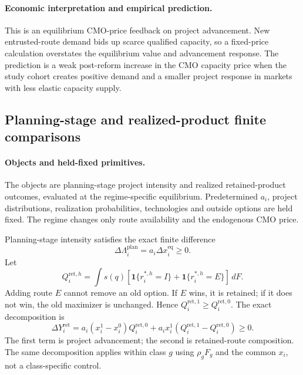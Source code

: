 \paragraph{Economic interpretation and empirical prediction.}
This is an equilibrium CMO-price feedback on project advancement. New
entrusted-route demand bids up scarce qualified capacity, so a fixed-price
calculation overstates the equilibrium value and advancement response. The
prediction is a weak post-reform increase in the CMO capacity price when the
study cohort creates positive demand and a smaller project response in markets
with less elastic capacity supply.

\subsection{Planning-stage and realized-product finite comparisons}
\label{subsec:p15-outcomes}

\paragraph{Objects and held-fixed primitives.}
The objects are planning-stage project intensity and realized retained-product
outcomes, evaluated at the regime-specific equilibrium. Predetermined
\(a_i\), project distributions, realization probabilities, technologies and
outside options are held fixed. The regime changes only route availability and
the endogenous CMO price.

Planning-stage intensity satisfies the exact finite difference
\begin{equation}
  \Delta\Lambda_i^{\mathrm{plan}}
  =
  a_i\Delta x_i^{\mathrm{eq}}\geq0.
  \label{eq:p15-planning-change}
\end{equation}
Let
\[
  Q_i^{\mathrm{ret},h}
  =
  \int s(q)
  [\mathbf 1\{r_i^{*,h}=I\}+\mathbf 1\{r_i^{*,h}=E\}]\,dF.
\]
Adding route \(E\) cannot remove an old option. If \(E\) wins, it is retained;
if it does not win, the old maximizer is unchanged. Hence
\(Q_i^{\mathrm{ret},1}\geq Q_i^{\mathrm{ret},0}\). The exact decomposition is
\begin{equation}
  \Delta Y_i^{\mathrm{ret}}
  =
  a_i(x_i^1-x_i^0)Q_i^{\mathrm{ret},0}
  +
  a_ix_i^1
  (Q_i^{\mathrm{ret},1}-Q_i^{\mathrm{ret},0})
  \geq0.
  \label{eq:p15-retained-outcome-change}
\end{equation}
The first term is project advancement; the second is retained-route
composition. The same decomposition applies within class \(g\) using
\(\rho_gF_g\) and the common \(x_i\), not a class-specific control.


